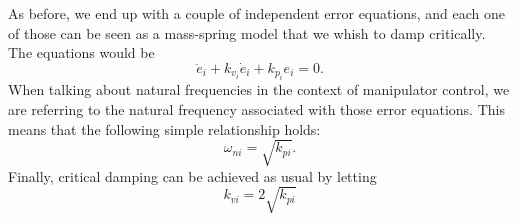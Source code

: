 As before, we end up with a couple of independent error equations, and each one of those can be seen as a mass-spring model that we whish to damp critically. The equations would be
$$
\ddot{e}_{i}+k_{v_{i}} \dot{e}_{i}+k_{p_{i}} e_{i}=0 .
$$
When talking about natural frequencies in the context of manipulator control, we are referring to the natural frequency associated with those error equations. This means that the following simple relationship holds:
$$
\omega_{n i}=\sqrt{k_{p i}} .
$$
Finally, critical damping can be achieved as usual by letting
$$
k_{v i}=2 \sqrt{k_{p i}}
$$